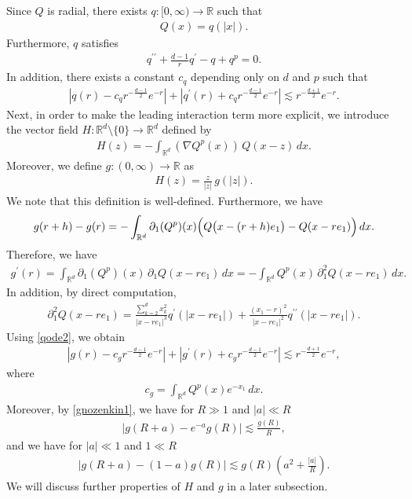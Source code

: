 \documentclass[reqno]{amsart}
\theoremstyle{plain}
\theoremstyle{definition}
\numberwithin{equation}{section}
\newcommand{\1}{\mathbbm{1}}
\begin{document}
Since $Q$ is radial, there exists $q:[0,\infty)\to\mathbb{R}$ such that
\begin{align*}
Q(x)=q(|x|).
\end{align*}
Furthermore, $q$ satisfies
\begin{align}\label{qode2}
q^{\prime \prime}+\frac{d-1}{r}q^{\prime}-q+q^p=0.
\end{align}
In addition, there exists a constant $c_q$ depending only on $d$ and $p$ such that
\begin{align}\label{qes}
|q(r)-c_qr^{-\frac{d-1}{2}}e^{-r}|+|q^{\prime}(r)+c_qr^{-\frac{d-1}{2}}e^{-r}|
\lesssim r^{-\frac{d+1}{2}}e^{-r}.
\end{align}
Next, in order to make the leading interaction term more explicit, we introduce the vector field
$H:\mathbb{R}^d\setminus\{0\}\to\mathbb{R}^d$ defined by
\begin{align}\label{Hdef}
H(z)=-\int_{\mathbb{R}^d}(\nabla Q^p(x))\,Q(x-z)\,dx.
\end{align}
Moreover, we define $g:(0,\infty)\to\mathbb{R}$ as
\begin{align*}
H(z)=\frac{z}{|z|}\,g(|z|).
\end{align*}
We note that this definition is well-defined. Furthermore, we have 
\begin{align*}
g(r+h)-g(r)
=-\int_{\mathbb{R}^d} {\partial}_1(Q^p)(x)\Bigl( Q\bigl(x-(r+h)e_1\bigr)-Q(x-re_1)\Bigr)\,dx.
\end{align*}
Therefore, we have 
\begin{align*}
g^{\prime}(r)
=\int_{\mathbb{R}^d} {\partial}_1(Q^p)(x)\,{\partial}_1Q(x-re_1)\,dx
=-\int_{\mathbb{R}^d}Q^p(x)\,{\partial}_1^2Q(x-re_1)\,dx.
\end{align*}
In addition, by direct computation,
\begin{align*}
{\partial}_1^2Q(x-re_1)
=\frac{\sum_{k=2}^dx_k^2}{|x-re_1|^3}q^{\prime}(|x-re_1|)
+\frac{(x_1-r)^2}{|x-re_1|^2}q^{\prime \prime}(|x-re_1|).
\end{align*}
Using \eqref{qode2}, we obtain
\begin{align}\label{gnozenkin1}
|g(r)-c_gr^{-\frac{d-1}{2}}e^{-r}|+|g^{\prime}(r)+c_gr^{-\frac{d-1}{2}}e^{-r}|
\lesssim r^{-\frac{d+1}{2}}e^{-r},
\end{align}
where
\begin{align*}
c_g=\int_{\mathbb{R}^d} Q^p(x)e^{-x_1}\,dx.
\end{align*}
Moreover, by \eqref{gnozenkin1}, we have for $R\gg 1$ and $|a| \ll R$
\begin{align}\label{gnozenkin2}
 \left|g(R+a)-e^{-a}g(R)\right|\lesssim \frac{g(R)}{R},
 \end{align}
 and we have for $|a|\ll 1$ and $1\ll R$
 \begin{align}\label{gnozenkin3}
\left|g(R+a)-(1-a)g(R)\right|\lesssim g(R)\left(a^2+\frac{|a|}{R}\right).
\end{align}
We will discuss further properties of $H$ and $g$ in a later subsection.
\end{document}
